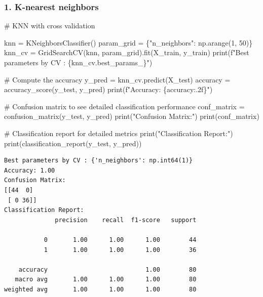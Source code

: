 \documentclass[
  letterpaper,
  DIV=11,
  numbers=noendperiod]{scrartcl}
\newenvironment{Shaded}{\begin{snugshade}}{\end{snugshade}}
\newcommand{\BuiltInTok}[1]{\textcolor[rgb]{0.00,0.23,0.31}{#1}}
\newcommand{\CommentTok}[1]{\textcolor[rgb]{0.37,0.37,0.37}{#1}}
\newcommand{\DecValTok}[1]{\textcolor[rgb]{0.68,0.00,0.00}{#1}}
\newcommand{\NormalTok}[1]{\textcolor[rgb]{0.00,0.23,0.31}{#1}}
\newcommand{\OperatorTok}[1]{\textcolor[rgb]{0.37,0.37,0.37}{#1}}
\newcommand{\SpecialCharTok}[1]{\textcolor[rgb]{0.37,0.37,0.37}{#1}}
\newcommand{\SpecialStringTok}[1]{\textcolor[rgb]{0.13,0.47,0.30}{#1}}
\newcommand{\StringTok}[1]{\textcolor[rgb]{0.13,0.47,0.30}{#1}}
\begin{document}
\subsubsection{1. K-nearest neighbors}\label{k-nearest-neighbors}

\begin{Shaded}
\begin{Highlighting}[]
\CommentTok{\# KNN with cross validation}

\NormalTok{knn }\OperatorTok{=}\NormalTok{ KNeighborsClassifier()}
\NormalTok{param\_grid }\OperatorTok{=}\NormalTok{ \{}\StringTok{"n\_neighbors"}\NormalTok{: np.arange(}\DecValTok{1}\NormalTok{, }\DecValTok{50}\NormalTok{)\}}
\NormalTok{knn\_cv }\OperatorTok{=}\NormalTok{ GridSearchCV(knn, param\_grid).fit(X\_train, y\_train)}
\BuiltInTok{print}\NormalTok{(}\SpecialStringTok{f"Best parameters by CV : }\SpecialCharTok{\{}\NormalTok{knn\_cv}\SpecialCharTok{.}\NormalTok{best\_params\_}\SpecialCharTok{\}}\SpecialStringTok{"}\NormalTok{)}

\CommentTok{\# Compute the accuracy}
\NormalTok{y\_pred }\OperatorTok{=}\NormalTok{ knn\_cv.predict(X\_test)}
\NormalTok{accuracy }\OperatorTok{=}\NormalTok{ accuracy\_score(y\_test, y\_pred)}
\BuiltInTok{print}\NormalTok{(}\SpecialStringTok{f"Accuracy: }\SpecialCharTok{\{}\NormalTok{accuracy}\SpecialCharTok{:.2f\}}\SpecialStringTok{"}\NormalTok{)}

\CommentTok{\# Confusion matrix to see detailed classification performance}
\NormalTok{conf\_matrix }\OperatorTok{=}\NormalTok{ confusion\_matrix(y\_test, y\_pred)}
\BuiltInTok{print}\NormalTok{(}\StringTok{"Confusion Matrix:"}\NormalTok{)}
\BuiltInTok{print}\NormalTok{(conf\_matrix)}

\CommentTok{\# Classification report for detailed metrics}
\BuiltInTok{print}\NormalTok{(}\StringTok{"Classification Report:"}\NormalTok{)}
\BuiltInTok{print}\NormalTok{(classification\_report(y\_test, y\_pred))}
\end{Highlighting}
\end{Shaded}

\begin{verbatim}
Best parameters by CV : {'n_neighbors': np.int64(1)}
Accuracy: 1.00
Confusion Matrix:
[[44  0]
 [ 0 36]]
Classification Report:
              precision    recall  f1-score   support

           0       1.00      1.00      1.00        44
           1       1.00      1.00      1.00        36

    accuracy                           1.00        80
   macro avg       1.00      1.00      1.00        80
weighted avg       1.00      1.00      1.00        80
\end{verbatim}
\end{document}
